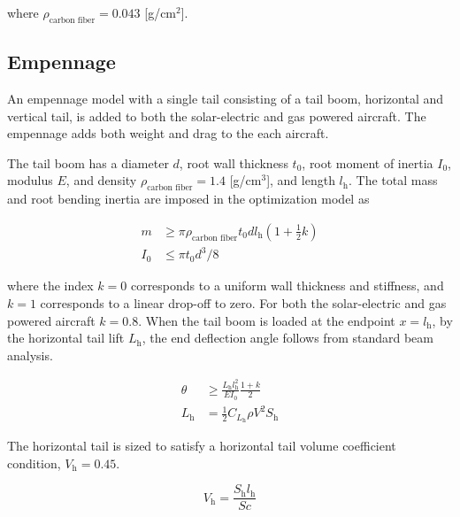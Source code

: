 \documentclass[]{aiaa-tc}%
\begin{document}
where $\rho_{\text{carbon fiber}} = 0.043$ [g/cm$^2$].\cite{carbonfiber}

\subsection{Empennage}

An empennage model with a single tail consisting of a tail boom, horizontal and vertical tail, is added to both the solar-electric and gas powered aircraft.  
The empennage adds both weight and drag to the each aircraft.  

The tail boom has a diameter $d$, root wall thickness $t_0$, root moment of inertia $I_0$, modulus $E$, and density $\rho_{\text{carbon fiber}} = 1.4$ [g/cm$^3$], and length $l_{\text{h}}$. 
The total mass and root bending inertia are imposed in the optimization model as 

\begin{align}
    m &\geq \pi \rho_{\text{carbon fiber}} t_0 d l_{\text{h}} \left( 1 + \frac{1}{2} k\right) \\
    I_0 &\leq \pi t_0 d^3/8
\end{align}

where the index $k=0$ corresponds to a uniform wall thickness and stiffness, and $k=1$ corresponds to a linear drop-off to zero.  For both the solar-electric and gas powered aircraft $k=0.8$.  When the tail boom is loaded at the endpoint $x=l_{\text{h}}$, by the horizontal tail lift $L_{\text{h}}$, the end deflection angle follows from standard beam analysis. 

\begin{align}
    \label{e:boomdefl}
    \theta &\geq \frac{L_{\text{h}} l_{\text{h}}^2}{EI_0} \frac{1+k}{2} \\
    L_{\text{h}} &= \frac{1}{2} C_{L_{\text{h}}} \rho V^2 S_{\text{h}}
\end{align}

The horizontal tail is sized to satisfy a horizontal tail volume coefficient condition, $V_{\text{h}} = 0.45$.\cite{aircraftrules}

\begin{equation}
    V_{\text{h}} = \frac{S_{\text{h}}l_{\text{h}}}{Sc}
\end{equation}
\end{document}

